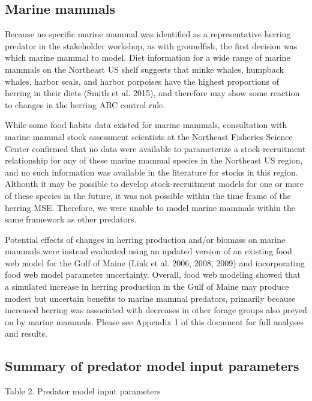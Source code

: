 \documentclass[]{article}
\begin{document}
\subsection{Marine mammals}\label{marine-mammals}

Because no specific marine mammal was identified as a representative
herring predator in the stakeholder workshop, as with groundfish, the
first decision was which marine mammal to model. Diet information for a
wide range of marine mammals on the Northeast US shelf suggests that
minke whales, humpback whales, harbor seals, and harbor porpoises have
the highest proportions of herring in their diets (Smith et al. 2015),
and therefore may show some reaction to changes in the herring ABC
control rule.

While some food habits data existed for marine mammals, consultation
with marine mammal stock assessment scientists at the Northeast
Fisheries Science Center confirmed that no data were available to
parameterize a stock-recruitment relationship for any of these marine
mammal species in the Northeast US region, and no such information was
available in the literature for stocks in this region. Althouth it may
be possible to develop stock-recruitment models for one or more of these
species in the future, it was not possible within the time frame of the
herring MSE. Therefore, we were unable to model marine mammals within
the same framework as other predators.

Potential effects of changes in herring production and/or biomass on
marine mammals were instead evaluated using an updated version of an
existing food web model for the Gulf of Maine (Link et al. 2006, 2008,
2009) and incorporating food web model parameter uncertainty. Overall,
food web modeling showed that a simulated increase in herring production
in the Gulf of Maine may produce modest but uncertain benefits to marine
mammal predators, primarily because increased herring was associated
with decreases in other forage groups also preyed on by marine mammals.
Please see Appendix 1 of this document for full analyses and results.

\subsection{Summary of predator model input
parameters}\label{summary-of-predator-model-input-parameters}

Table 2. Predator model input parameters
\end{document}
